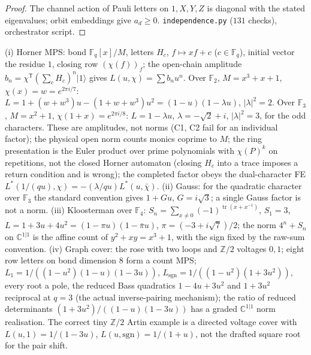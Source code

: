 \begin{proof}
The channel action of Pauli letters on $1, X, Y, Z$ is diagonal with the stated eigenvalues; orbit
embeddings give $a_d\ge0$. \texttt{independence.py} ($131$ checks), orchestrator script.
\end{proof}

\begin{proposition}
\label{prop:tiny-l-functions}
(i) Horner MPS: bond $\mathbb F_q[x]/M$, letters $H_c$, $f\mapsto xf+c$ ($c\in\mathbb F_q$), initial vector the
residue $1$, closing row $(\chi(f))_f$; the open-chain amplitude $b_n = \chi^{\mathsf T}(\sum_cH_c)^n|1\rangle$
gives $L(u,\chi) = \sum b_nu^n$. Over $\mathbb F_2$, $M = x^3+x+1$, $\chi(x) = w = e^{2\pi i/7}$:
$L = 1+(w+w^3)u-(1+w+w^3)u^2 = (1-u)(1-\lambda u)$, $|\lambda|^2 = 2$. Over $\mathbb F_3$, $M = x^2+1$,
$\chi(1+x) = e^{2\pi i/8}$: $L = 1-\lambda u$, $\lambda = -\sqrt2+i$, $|\lambda|^2 = 3$, for the odd characters.
These are amplitudes, not norms (C1, C2 fail for an individual factor); the physical open norm counts
monics coprime to $M$; the ring presentation is the Euler product over prime polynomials with
$\chi(P)^k$ on repetitions, not the closed Horner automaton (closing $H_c$ into a trace imposes a
return condition and is wrong); the completed factor obeys the dual-character FE
$L^*(1/(qu),\chi) = -(\lambda/qu)L^*(u,\bar\chi)$. (ii) Gauss: for the quadratic character over $\mathbb F_3$
the standard convention gives $1+Gu$, $G = i\sqrt3$; a single Gauss factor is not a norm.
(iii) Kloosterman over $\mathbb F_4$: $S_n = \sum_{x\ne0}(-1)^{\operatorname{tr}(x+x^{-1})}$, $S_1 = 3$,
$L = 1+3u+4u^2 = (1-\pi u)(1-\bar\pi u)$, $\pi = (-3+i\sqrt7)/2$; the norm $4^n+S_n$ on $\mathbb C^{1|1}$
is the affine count of $y^2+xy = x^3+1$, with the sign fixed by the raw-sum convention.
(iv) Graph cover: the rose with two loops and $\mathbb Z/2$ voltages $0,1$; eight row letters on bond
dimension $8$ form a count MPS; $L_1 = 1/((1-u^2)(1-u)(1-3u))$, $L_{\mathrm{sgn}} = 1/((1-u^2)(1+3u^2))$,
every root a pole, the reduced Bass quadratics $1-4u+3u^2$ and $1+3u^2$ reciprocal at $q = 3$ (the
actual inverse-pairing mechanism); the ratio of reduced determinants $(1+3u^2)/((1-u)(1-3u))$ has a
graded $\mathbb C^{1|1}$ norm realisation. The correct tiny $\mathbb Z/2$ Artin example is a directed
voltage cover with $L(u,1) = 1/(1-3u)$, $L(u,\mathrm{sgn}) = 1/(1+u)$, not the drafted square root for the
pair shift.
\end{proposition}


